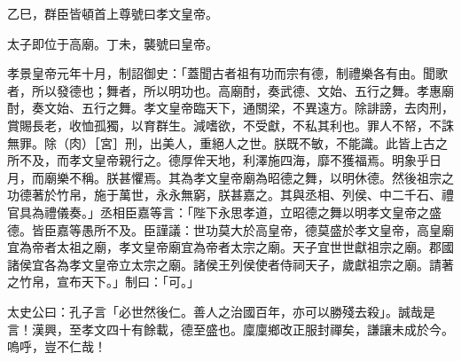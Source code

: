 \begin{pinyinscope}
乙巳，群臣皆頓首上尊號曰孝文皇帝。

太子即位于高廟。丁未，襲號曰皇帝。

孝景皇帝元年十月，制詔御史：「蓋聞古者祖有功而宗有德，制禮樂各有由。聞歌者，所以發德也；舞者，所以明功也。高廟酎，奏武德、文始、五行之舞。孝惠廟酎，奏文始、五行之舞。孝文皇帝臨天下，通關梁，不異遠方。除誹謗，去肉刑，賞賜長老，收恤孤獨，以育群生。減嗜欲，不受獻，不私其利也。罪人不帑，不誅無罪。除（肉）［宮］刑，出美人，重絕人之世。朕既不敏，不能識。此皆上古之所不及，而孝文皇帝親行之。德厚侔天地，利澤施四海，靡不獲福焉。明象乎日月，而廟樂不稱。朕甚懼焉。其為孝文皇帝廟為昭德之舞，以明休德。然後祖宗之功德著於竹帛，施于萬世，永永無窮，朕甚嘉之。其與丞相、列侯、中二千石、禮官具為禮儀奏。」丞相臣嘉等言：「陛下永思孝道，立昭德之舞以明孝文皇帝之盛德。皆臣嘉等愚所不及。臣謹議：世功莫大於高皇帝，德莫盛於孝文皇帝，高皇廟宜為帝者太祖之廟，孝文皇帝廟宜為帝者太宗之廟。天子宜世世獻祖宗之廟。郡國諸侯宜各為孝文皇帝立太宗之廟。諸侯王列侯使者侍祠天子，歲獻祖宗之廟。請著之竹帛，宣布天下。」制曰：「可。」

太史公曰：孔子言「必世然後仁。善人之治國百年，亦可以勝殘去殺」。誠哉是言！漢興，至孝文四十有餘載，德至盛也。廩廩鄉改正服封禪矣，謙讓未成於今。嗚呼，豈不仁哉！


\end{pinyinscope}